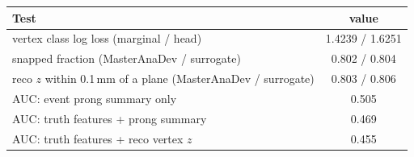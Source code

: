 \begin{tabular}{lc}
\toprule
Test & value \\
\midrule
vertex class log loss (marginal / head) & 1.4239 / 1.6251 \\
snapped fraction (MasterAnaDev / surrogate) & 0.802 / 0.804 \\
reco $z$ within 0.1\,mm of a plane (MasterAnaDev / surrogate) & 0.803 / 0.806 \\
\midrule
AUC: event prong summary only & 0.505 \\
AUC: truth features + prong summary & 0.469 \\
AUC: truth features + reco vertex $z$ & 0.455 \\
\bottomrule
\end{tabular}
